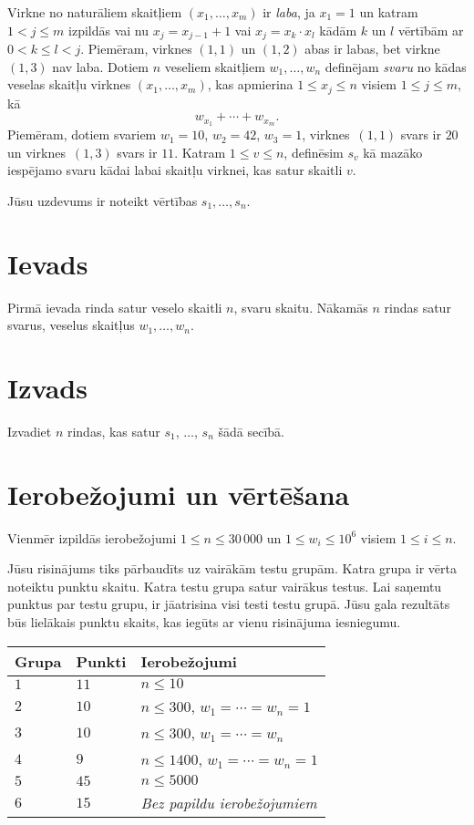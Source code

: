 
\noindent
Virkne no naturāliem skaitļiem $(x_1, \ldots, x_m)$ ir \emph{laba}, ja $x_1 = 1$ un katram $1 < j \leq m$ izpildās vai nu $x_j = x_{j-1}+1$ vai $x_j = x_k \cdot x_l$ kādām $k$ un $l$ vērtībām ar $0 < k \leq l < j$. 
Piemēram, virknes $(1,1)$ un $(1,2)$ abas ir labas, bet virkne $(1,3)$ nav laba.
Dotiem $n$ veseliem skaitļiem $w_1, \ldots, w_n$ definējam \emph{svaru} no kādas veselas skaitļu virknes $(x_1, \ldots, x_m)$, kas apmierina $1 \leq x_j \leq n$ visiem $1 \leq j \leq m$, kā
\[ w_{x_1} + \cdots + w_{x_m}. \]
Piemēram, dotiem svariem $w_1 = 10$, $w_2 = 42$, $w_3 = 1$, virknes~$(1,1)$ svars ir $20$ un virknes~$(1,3)$ svars ir $11$. 
Katram $1\leq v\leq n$, definēsim $s_v$ kā mazāko iespējamo svaru kādai labai skaitļu virknei, kas satur skaitli $v$.

Jūsu uzdevums ir noteikt vērtības $s_1,\ldots ,s_n$.

\section*{Ievads}

Pirmā ievada rinda satur veselo skaitli $n$, svaru skaitu.
Nākamās $n$ rindas satur svarus, veselus skaitļus $w_1, \ldots, w_n$.

\section*{Izvads}

Izvadiet $n$ rindas, kas satur $s_1$, $\ldots$, $s_n$ šādā secībā.

\section*{Ierobežojumi un vērtēšana}

Vienmēr izpildās ierobežojumi
$1\leq n \leq 30\,000$ %
un
$1\leq w_i \leq 10^6$ visiem $1\leq i \leq n$.%

Jūsu risinājums tiks pārbaudīts uz vairākām testu grupām. Katra grupa ir vērta noteiktu punktu skaitu.
Katra testu grupa satur vairākus testus.
Lai saņemtu punktus par testu grupu, ir jāatrisina visi testi testu grupā.
Jūsu gala rezultāts būs lielākais punktu skaits, kas iegūts ar vienu risinājuma iesniegumu.

\medskip
\begin{tabular}{lll}
Grupa & Punkti & Ierobežojumi \\\hline
$1$   & $11$ & $n\leq 10$ \\
$2$   & $10$ & $n\leq 300$, $w_1=\cdots=w_n = 1$ \\
$3$   & $10$ & $n\leq 300$, $w_1=\cdots=w_n$ \\ %
$4$   & $9$ & $n\leq 1400$, $w_1=\cdots=w_n = 1$ \\
$5$   & $45$ & $n\leq 5000$\\
$6$   & $15$ & \emph{Bez papildu ierobežojumiem}
\end{tabular}
